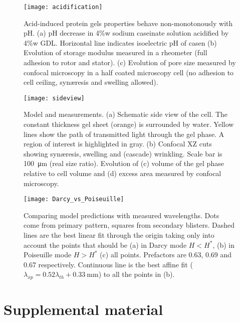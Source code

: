 \documentclass[twocolumn,superscriptaddress,showpacs,preprintnumbers,amsmath,amssymb,prl]{revtex4-1}
\begin{document}
\begin{figure}
	\texttt{[image: acidification]}
	\caption{Acid-induced protein gels properties behave non-monotonously with pH. (a) pH decrease in 4\%w sodium caseinate solution acidified by 4\%w GDL. Horizontal line indicates isoelectric pH of casen (b) Evolution of storage modulus measured in a rheometer (full adhesion to rotor and stator). (c) Evolution of pore size measured by confocal microscopy in a half coated microscopy cell (no adhesion to cell ceiling, syn\ae{}resis and swelling allowed).}
	\label{fig:acidification}
\end{figure}

\begin{figure}
	\texttt{[image: sideview]}
	\caption{Model and measurements. (a) Schematic side view of the cell. The constant thickness gel sheet (orange) is surrounded by water. Yellow lines show the path of transmitted light through the gel phase. A region of interest is highlighted in gray. (b) Confocal XZ cuts showing syn\ae{}resis, swelling and (cascade) wrinkling. Scale bar is \SI{100}{\micro\metre} (real size ratio). Evolution of (c) volume of the gel phase relative to cell volume and (d) excess area measured by confocal microscopy.}
	\label{fig:sideview}
\end{figure}

\begin{figure*}
	\texttt{[image: Darcy\_vs\_Poiseuille]}
	\caption{Comparing model predictions with measured wavelengths. Dots come from primary pattern, squares from secondary blisters. Dashed lines are the best linear fit through the origin taking only into account the points that should be (a) in Darcy mode $H<H^*$, (b) in Poiseuille mode $H>H^*$ (c) all points. Prefactors are 0.63, 0.69 and 0.67 respectively. Continuous line is the best affine fit ($\lambda_{xp}=0.52\lambda_{th}+\SI{0.33}{\milli\metre}$) to all the points in (b).}
	\label{fig:DarcyPoiseuille}
\end{figure*}

\clearpage
\newpage
\setcounter{figure}{0}

\section*{Supplemental material}
\end{document}
